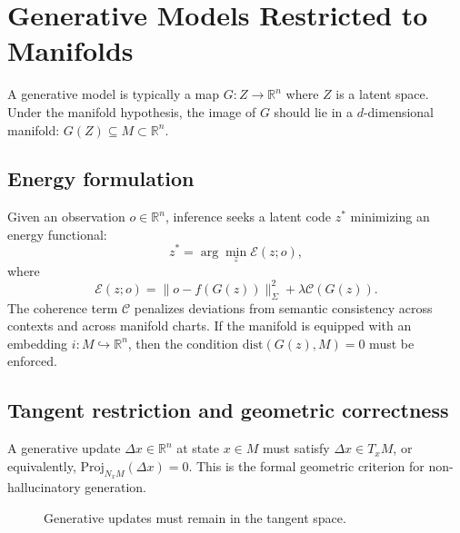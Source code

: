 \documentclass[11pt,a4paper,twocolumn]{article}
\begin{document}

\section{Generative Models Restricted to Manifolds}

A generative model is typically a map $G : Z \to \mathbb{R}^n$ where
$Z$ is a latent space. Under the manifold hypothesis, the image of $G$
should lie in a $d$-dimensional manifold: $G(Z) \subseteq M \subset
\mathbb{R}^n$.

\subsection{Energy formulation}

Given an observation $o \in \mathbb{R}^n$, inference seeks a latent code
$z^\ast$ minimizing an energy functional:
\[
z^\ast = \arg\min_z \mathcal{E}(z; o),
\]
where
\[
\mathcal{E}(z; o) = \|o - f(G(z))\|^2_\Sigma + \lambda \mathcal{C}(G(z)).
\]
The coherence term $\mathcal{C}$ penalizes deviations from semantic
consistency across contexts and across manifold charts. If the manifold
is equipped with an embedding $i : M \hookrightarrow \mathbb{R}^n$, then
the condition $\mathrm{dist}(G(z), M) = 0$ must be enforced.

\subsection{Tangent restriction and geometric correctness}

A generative update $\Delta x \in \mathbb{R}^n$ at state $x \in M$ must
satisfy $\Delta x \in T_x M$, or equivalently,
$\mathrm{Proj}_{N_x M} (\Delta x) = 0$.
This is the formal geometric criterion for non-hallucinatory generation.

\begin{figure}[H]
\centering
{}
\caption{Generative updates must remain in the tangent space.}
\end{figure}
\end{document}
